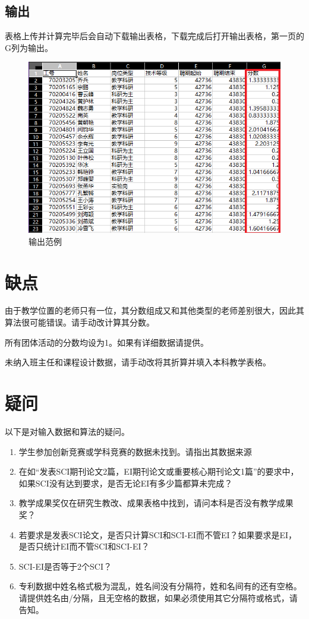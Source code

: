 \documentclass[UTF8,fontset=windowsnew]{ctexart}
\begin{document}
\subsection{输出}
表格上传并计算完毕后会自动下载输出表格，下载完成后打开输出表格，第一页的G列为输出。\par
\begin{figure}[h]
  \centering
  \includegraphics[width=.5\textwidth]{image/output.png}
  \caption{输出范例}
  \label{fig:output}
\end{figure}
\section{缺点}
由于教学位置的老师只有一位，其分数组成又和其他类型的老师差别很大，因此其算法很可能错误。请手动改计算其分数。\par
所有团体活动的分数均设为1。如果有详细数据请提供。\par
未纳入班主任和课程设计数据，请手动改将其折算并填入本科教学表格。\par
\section{疑问}
以下是对输入数据和算法的疑问。
\begin{enumerate}
  \item 学生参加创新竞赛或学科竞赛的数据未找到。请指出其数据来源
  \item 在如``发表SCI期刊论文2篇，EI期刊论文或重要核心期刊论文1篇''的要求中，如果SCI没有达到要求，是否无论EI有多少篇都算未完成？
  \item 教学成果奖仅在研究生教改、成果表格中找到，请问本科是否没有教学成果奖？
  \item 若要求是发表SCI论文，是否只计算SCI和SCI-EI而不管EI？如果要求是EI，是否只统计EI而不管SCI和SCI-EI？
  \item SCI-EI是否等于2个SCI？
  \item 专利数据中姓名格式极为混乱，姓名间没有分隔符，姓和名间有的还有空格。请提供姓名由/分隔，且无空格的数据，如果必须使用其它分隔符或格式，请告知。
\end{enumerate}
\end{document}
